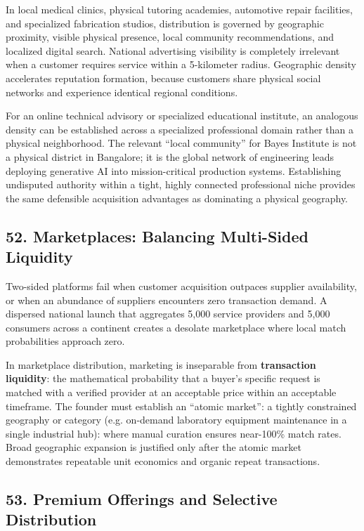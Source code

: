 In local medical clinics, physical tutoring academies, automotive repair facilities, and specialized fabrication studios, distribution is governed by geographic proximity, visible physical presence, local community recommendations, and localized digital search. National advertising visibility is completely irrelevant when a customer requires service within a 5-kilometer radius. Geographic density accelerates reputation formation, because customers share physical social networks and experience identical regional conditions.

For an online technical advisory or specialized educational institute, an analogous density can be established across a specialized professional domain rather than a physical neighborhood. The relevant ``local community'' for Bayes Institute is not a physical district in Bangalore; it is the global network of engineering leads deploying generative AI into mission-critical production systems. Establishing undisputed authority within a tight, highly connected professional niche provides the same defensible acquisition advantages as dominating a physical geography.

\subsection*{52. Marketplaces: Balancing Multi-Sided Liquidity}

Two-sided platforms fail when customer acquisition outpaces supplier availability, or when an abundance of suppliers encounters zero transaction demand. A dispersed national launch that aggregates 5,000 service providers and 5,000 consumers across a continent creates a desolate marketplace where local match probabilities approach zero.

In marketplace distribution, marketing is inseparable from \textbf{transaction liquidity}: the mathematical probability that a buyer's specific request is matched with a verified provider at an acceptable price within an acceptable timeframe. The founder must establish an ``atomic market'': a tightly constrained geography or category (e.g. on-demand laboratory equipment maintenance in a single industrial hub): where manual curation ensures near-100\% match rates. Broad geographic expansion is justified only after the atomic market demonstrates repeatable unit economics and organic repeat transactions.

\subsection*{53. Premium Offerings and Selective Distribution}

